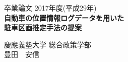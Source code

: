 \begin{titlepage}
  \begin{center}
    \begin{large}
      卒業論文   2017年度(平成29年)\\
      \vspace{72pt}
      \textbf{自動車の位置情報ログデータを用いた\\
      駐車区画推定手法の提案}
      \end{large}
  \end{center}
  \vspace{40em}
  \begin{flushright}
    \large 慶應義塾大学 総合政策学部\\
    豊田　安信
  \end{flushright}
\end{titlepage}
